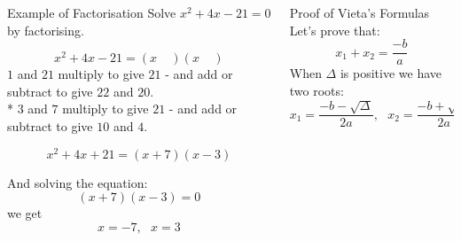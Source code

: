 \documentclass[final]{beamer}
\newlength{\onecolwid}
\newlength{\twocolwid}
\begin{document}
\begin{frame}[t]
\begin{columns}[t]
\begin{column}{\twocolwid}
\begin{columns}[t,totalwidth=\twocolwid]
                \begin{column}{\onecolwid} %


                    \begin{block}{Example of Factorisation}
                        Solve $x^2+4x-21=0$ by factorising.

                        $$x^2+4x-21=(x\ \ \ \ \ )(x\ \ \ \ \ )$$
                        $1$ and $21$ multiply to give $21$ - and add or subtract to give $22$ and $20$.\\*
                        $3$ and $7$ multiply to give $21$ - and add or subtract to give $10$ and \textbf{$4$}.

                        $$x^2+4x+21 = (x+7)(x-3)$$

                        And solving the equation:
                        $$(x+7)(x-3)=0$$
                        we get
                        $$x=-7,\ \ \ x=3$$

                    \end{block}


                \end{column} %

                \begin{column}{\onecolwid} %


                    \begin{block}{ Proof of Vieta's Formulas}
                        Let's prove that:
                        $$x_1 + x_2 = \frac{-b}{a}$$
                        When $\Delta$ is positive we have two roots:
                        $$x_1 = \frac{-b-\sqrt{\Delta}}{2a},\ \ \ x_2 = \frac{-b+\sqrt{\Delta}}{2a}$$


\end{block}
\end{column}
\end{columns}
\end{column}
\end{columns}
\end{frame}
\end{document}
